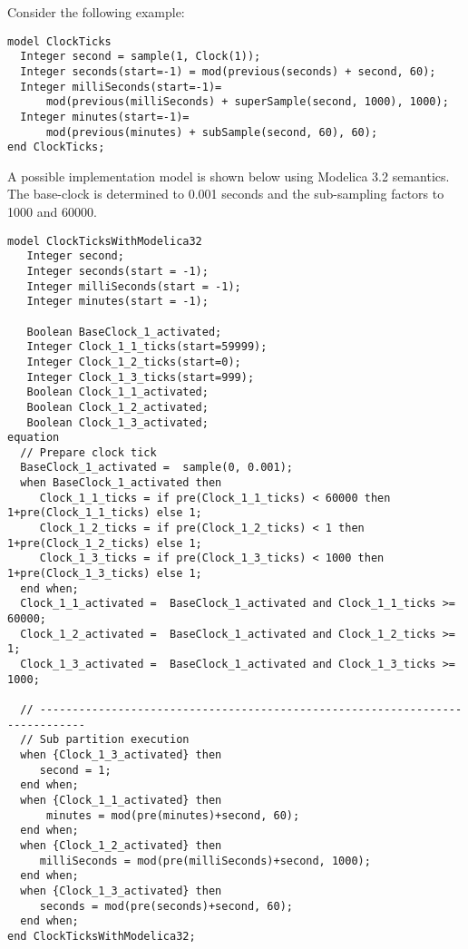 \begin{nonnormative}
Consider the following example:
\begin{lstlisting}[language=modelica]
model ClockTicks
  Integer second = sample(1, Clock(1));
  Integer seconds(start=-1) = mod(previous(seconds) + second, 60);
  Integer milliSeconds(start=-1)=
      mod(previous(milliSeconds) + superSample(second, 1000), 1000);
  Integer minutes(start=-1)=
      mod(previous(minutes) + subSample(second, 60), 60);
end ClockTicks;
\end{lstlisting}

A possible implementation model is shown below using Modelica 3.2 semantics.  The base-clock is determined to 0.001 seconds and the sub-sampling factors to 1000 and 60000.

\begin{lstlisting}[language=modelica]
model ClockTicksWithModelica32
   Integer second;
   Integer seconds(start = -1);
   Integer milliSeconds(start = -1);
   Integer minutes(start = -1);

   Boolean BaseClock_1_activated;
   Integer Clock_1_1_ticks(start=59999);
   Integer Clock_1_2_ticks(start=0);
   Integer Clock_1_3_ticks(start=999);
   Boolean Clock_1_1_activated;
   Boolean Clock_1_2_activated;
   Boolean Clock_1_3_activated;
equation
  // Prepare clock tick
  BaseClock_1_activated =  sample(0, 0.001);
  when BaseClock_1_activated then
     Clock_1_1_ticks = if pre(Clock_1_1_ticks) < 60000 then 1+pre(Clock_1_1_ticks) else 1;
     Clock_1_2_ticks = if pre(Clock_1_2_ticks) < 1 then 1+pre(Clock_1_2_ticks) else 1;
     Clock_1_3_ticks = if pre(Clock_1_3_ticks) < 1000 then 1+pre(Clock_1_3_ticks) else 1;
  end when;
  Clock_1_1_activated =  BaseClock_1_activated and Clock_1_1_ticks >= 60000;
  Clock_1_2_activated =  BaseClock_1_activated and Clock_1_2_ticks >= 1;
  Clock_1_3_activated =  BaseClock_1_activated and Clock_1_3_ticks >= 1000;

  // -----------------------------------------------------------------------------
  // Sub partition execution
  when {Clock_1_3_activated} then
     second = 1;
  end when;
  when {Clock_1_1_activated} then
      minutes = mod(pre(minutes)+second, 60);
  end when;
  when {Clock_1_2_activated} then
     milliSeconds = mod(pre(milliSeconds)+second, 1000);
  end when;
  when {Clock_1_3_activated} then
     seconds = mod(pre(seconds)+second, 60);
  end when;
end ClockTicksWithModelica32;
\end{lstlisting}
\end{nonnormative}
